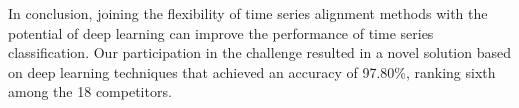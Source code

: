 In conclusion, joining the flexibility of time series alignment methods with the potential of deep learning can improve the performance of time series classification. Our participation in the challenge resulted in a novel solution based on deep learning techniques that achieved an accuracy of 97.80\%, ranking sixth among the 18 competitors.




